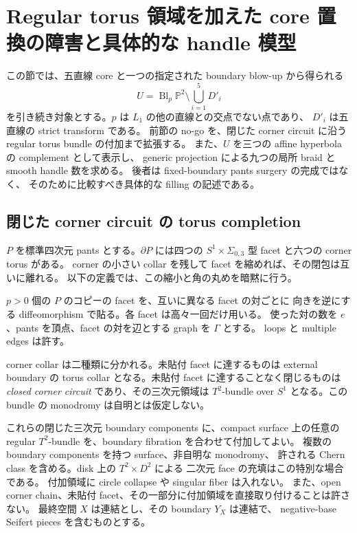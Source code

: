 \section{Regular torus 領域を加えた core 置換の障害と具体的な handle 模型}
\label{cs7:section}

この節では、五直線 core と一つの指定された boundary blow-up から得られる
\[
 U=\operatorname{Bl}_p\mathbb P^2\setminus\bigcup_{i=1}^5D'_i
\]
を引き続き対象とする。$p$ は $L_1$ の他の直線との交点でない点であり、
$D'_i$ は五直線の strict transform である。
前節の no-go を、閉じた corner circuit に沿う regular torus bundle の付加まで拡張する。
また、$U$ を三つの affine hyperbola の complement として表示し、
generic projection による九つの局所 braid と smooth handle 数を求める。
後者は fixed-boundary pants surgery の完成ではなく、
そのために比較すべき具体的な filling の記述である。

\subsection{閉じた corner circuit の torus completion}

$P$ を標準四次元 pants とする。$\partial P$ には四つの
$S^1\times\Sigma_{0,3}$ 型 facet と六つの corner torus がある。
corner の小さい collar を残して facet を縮めれば、その閉包は互いに離れる。
以下の定義では、この縮小と角の丸めを暗黙に行う。

\begin{definition}
\label{cs7:completiondef}
$p>0$ 個の $P$ のコピーの facet を、互いに異なる facet の対ごとに
向きを逆にする diffeomorphism で貼る。各 facet は高々一回だけ用いる。
使った対の数を $e$、pants を頂点、facet の対を辺とする graph を $\Gamma$ とする。
loops と multiple edges は許す。

corner collar は二種類に分かれる。未貼付 facet に達するものは
external boundary の torus collar となる。未貼付 facet に達することなく閉じるものは
\emph{closed corner circuit} であり、その三次元領域は $T^2$-bundle over $S^1$
となる。この bundle の monodromy は自明とは仮定しない。

これらの閉じた三次元 boundary components に、compact surface 上の任意の
regular $T^2$-bundle を、boundary fibration を合わせて付加してよい。
複数の boundary components を持つ surface、非自明な monodromy、
許される Chern class を含める。disk 上の $T^2\times D^2$ による
二次元 face の充填はこの特別な場合である。
付加領域に circle collapse や singular fiber は入れない。
また、open corner chain、未貼付 facet、その一部分に付加領域を直接取り付けることは許さない。
最終空間 $X$ は連結とし、その boundary $Y_X$ は連結で、
negative-base Seifert pieces を含むものとする。
\end{definition}

